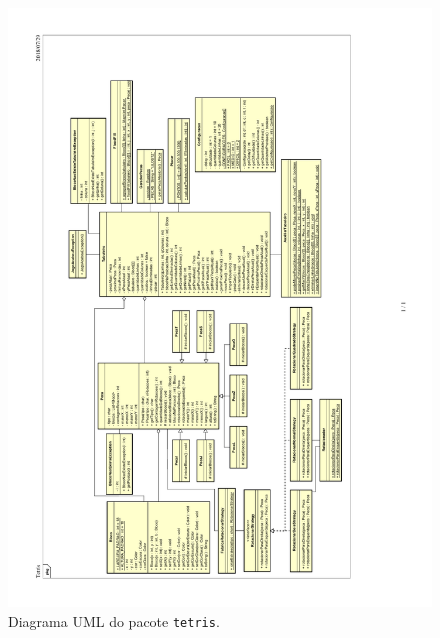 \documentclass[a4paper, 12pt]{article}
\begin{document}
  \begin{landscape}
  \begin{figure}
    \centering
    \includegraphics[angle=-90,trim=2.2cm 1.5cm 4.3cm 3cm,clip]{diagram/package-tetris.pdf}
    \caption{Diagrama UML do pacote \texttt{tetris}.}
  \end{figure}
  \end{landscape}
\end{document}
